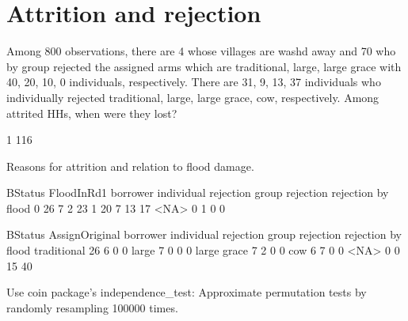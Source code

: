 \section{Attrition and rejection}
\label{AppSecAttritionRejection}
\setcounter{table}{0}



Among 800 observations, there are 4 whose villages are washd away and 70 who by group rejected the assigned arms which are traditional, large, large grace with 40, 20, 10, 0 individuals, respectively. There are 31, 9, 13, 37 individuals who individually rejected traditional, large, large grace, cow, respectively. Among attrited HHs, when were they lost?
\begin{Schunk}
\begin{Soutput}

  1 
116 
\end{Soutput}
\end{Schunk}
Reasons for attrition and relation to flood damage.
\begin{Schunk}
\begin{Soutput}
          BStatus
FloodInRd1 borrower individual rejection group rejection rejection by flood
      0          26                    7               2                 23
      1          20                    7              13                 17
      <NA>        0                    1               0                  0
\end{Soutput}
\begin{Soutput}
              BStatus
AssignOriginal borrower individual rejection group rejection rejection by flood
   traditional       26                    6               0                  0
   large              7                    0               0                  0
   large grace        7                    2               0                  0
   cow                6                    7               0                  0
   <NA>               0                    0              15                 40
\end{Soutput}
\end{Schunk}
Use \textsf{coin} package's \textsf{independence\_test}: Approximate permutation tests by randomly resampling 100000 times.


